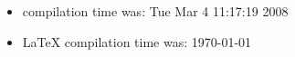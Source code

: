 \documentclass{article}
\begin{document}
\begin{itemize}
  \item \Rlogo{} compilation time was: Tue Mar  4 11:17:19 2008
  \item \LaTeX{} compilation time was: \today
\end{itemize}


\clearpage
{}


\end{document}
